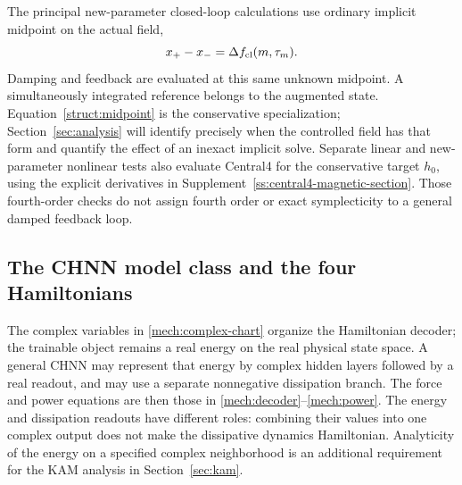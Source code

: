 The principal new-parameter closed-loop calculations use ordinary implicit midpoint on the actual field,
\begin{equation}\label{struct:general-midpoint}
 x_+-x_-=\Delta f_{\rm cl}(m,\tau_m).
\end{equation}
Damping and feedback are evaluated at this same unknown midpoint. A simultaneously integrated reference belongs to the augmented state. Equation~\eqref{struct:midpoint} is the conservative specialization; Section~\ref{sec:analysis} will identify precisely when the controlled field has that form and quantify the effect of an inexact implicit solve. Separate linear and new-parameter nonlinear tests also evaluate Central4 for the conservative target $h_0$, using the explicit derivatives in Supplement~\ref{ss:central4-magnetic-section}. Those fourth-order checks do not assign fourth order or exact symplecticity to a general damped feedback loop.

\subsection{The CHNN model class and the four Hamiltonians}
\label{struct:objects-section}

The complex variables in \eqref{mech:complex-chart} organize the Hamiltonian decoder; the trainable object remains a real energy on the real physical state space. A general CHNN may represent that energy by complex hidden layers followed by a real readout, and may use a separate nonnegative dissipation branch. The force and power equations are then those in \eqref{mech:decoder}--\eqref{mech:power}. The energy and dissipation readouts have different roles: combining their values into one complex output does not make the dissipative dynamics Hamiltonian. Analyticity of the energy on a specified complex neighborhood is an additional requirement for the KAM analysis in Section~\ref{sec:kam}.

